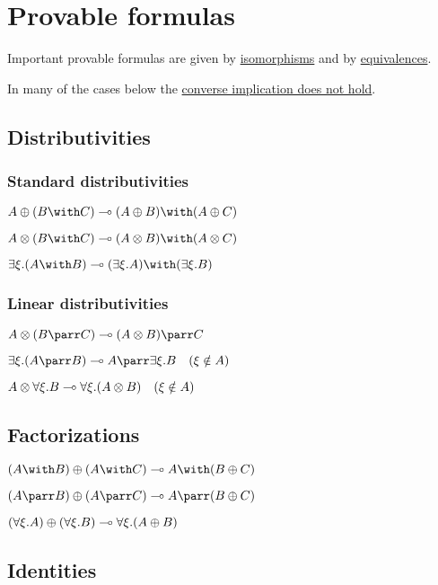 \section{Provable formulas}\label{provable-formulas}

Important provable formulas are given by
\href{List_of_isomorphisms}{isomorphisms} and by
\href{List_of_equivalences}{equivalences}.

In many of the cases below the \href{Non_provable_formulas}{converse
implication does not hold}.

\subsection{Distributivities}\label{distributivities}

\subsubsection{Standard
distributivities}\label{standard-distributivities}

\(A\plus (B\with C) \limp (A\plus B)\with (A\plus C)\)

\(A\tens (B\with C) \limp (A\tens B)\with (A\tens C)\)

\(\exists \xi . (A \with B) \limp (\exists \xi . A) \with (\exists \xi . B)\)

\subsubsection{Linear distributivities}\label{linear-distributivities}

\(A\tens (B\parr C) \limp (A\tens B)\parr C\)

\(\exists \xi. (A \parr B) \limp A \parr \exists \xi.B  \quad  (\xi\notin A)\)

\(A \otimes \forall \xi.B \multimap \forall \xi. (A \otimes B) \quad  (\xi\notin A)\)

\subsection{Factorizations}\label{factorizations}

\((A\with B)\plus (A\with C) \limp A\with (B\plus C)\)

\((A\parr B)\plus (A\parr C) \limp A\parr (B\plus C)\)

\((\forall \xi . A) \oplus (\forall \xi . B) \multimap \forall \xi . (A \oplus B)\)

\subsection{Identities}\label{identities}

